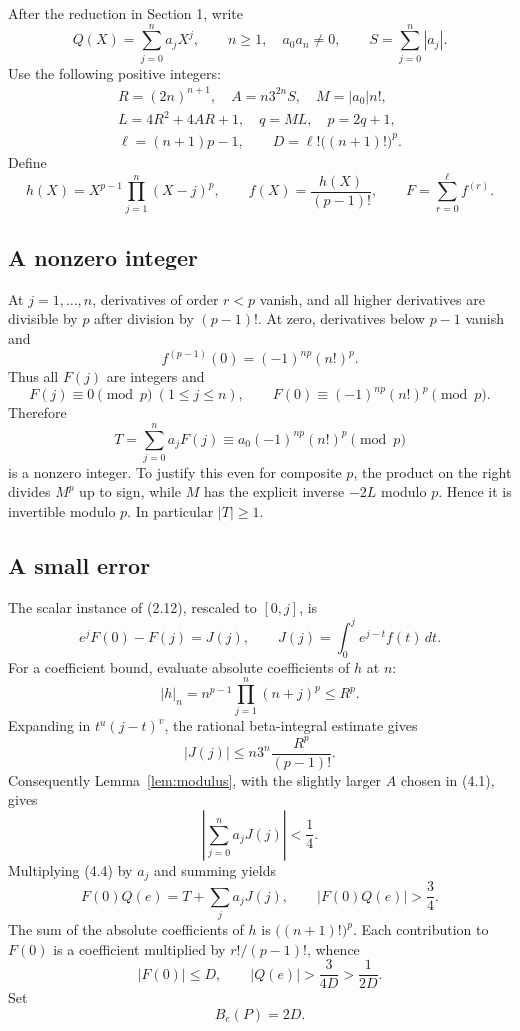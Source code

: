 \documentclass[11pt]{article}
\theoremstyle{definition}
\begin{document}
After the reduction in Section 1, write
\[
 Q(X)=\sum_{j=0}^n a_jX^j,\qquad n\ge1,\quad a_0a_n\ne0,
 \qquad S=\sum_{j=0}^n|a_j|.
\]
Use the following positive integers:
\[
 \begin{gathered}
 R=(2n)^{n+1},\quad A=n3^{2n}S,\quad M=|a_0|n!,\\
 L=4R^2+4AR+1,\quad q=ML,\quad p=2q+1,\\
 \ell=(n+1)p-1,\qquad
 D=\ell!\bigl((n+1)!\bigr)^p.
 \end{gathered} \tag{4.1}
\]
Define
\[
 h(X)=X^{p-1}\prod_{j=1}^n(X-j)^p,\qquad
 f(X)=\frac{h(X)}{(p-1)!},\qquad F=\sum_{r=0}^{\ell}f^{(r)}.
 \tag{4.2}
\]

\subsection{A nonzero integer}

At \(j=1,\ldots,n\), derivatives of order \(r<p\) vanish, and all
higher derivatives are divisible by \(p\) after division by \((p-1)!\).
At zero, derivatives below \(p-1\) vanish and
\[
 f^{(p-1)}(0)=(-1)^{np}(n!)^p.
\]
Thus all \(F(j)\) are integers and
\[
 F(j)\equiv0\pmod p\ (1\le j\le n),\qquad
 F(0)\equiv(-1)^{np}(n!)^p\pmod p. \tag{4.3}
\]
Therefore
\[
 T=\sum_{j=0}^na_jF(j)
 \equiv a_0(-1)^{np}(n!)^p\pmod p
\]
is a nonzero integer. To justify this even for composite \(p\), the
product on the right divides \(M^p\) up to sign, while
\(M\) has the explicit inverse \(-2L\) modulo \(p\).
Hence it is invertible modulo \(p\). In particular \(|T|\ge1\).

\subsection{A small error}

The scalar instance of (2.12), rescaled to \([0,j]\), is
\[
 e^jF(0)-F(j)=J(j),\qquad
 J(j)=\int_0^j e^{j-t}f(t)\,dt. \tag{4.4}
\]
For a coefficient bound, evaluate absolute coefficients of \(h\) at \(n\):
\[
 |h|_n=n^{p-1}\prod_{j=1}^n(n+j)^p\le R^p.
\]
Expanding in \(t^u(j-t)^v\), the rational beta-integral estimate gives
\[
 |J(j)|\le n3^n\frac{R^p}{(p-1)!}.
\]
Consequently Lemma~\ref{lem:modulus}, with the slightly larger \(A\)
chosen in (4.1), gives
\[
 \left|\sum_{j=0}^na_jJ(j)\right|<\frac14. \tag{4.5}
\]
Multiplying (4.4) by \(a_j\) and summing yields
\[
 F(0)Q(e)=T+\sum_j a_jJ(j),\qquad
 |F(0)Q(e)|>\frac34. \tag{4.6}
\]
The sum of the absolute coefficients of \(h\) is
\(\bigl((n+1)!\bigr)^p\). Each contribution to \(F(0)\) is
a coefficient multiplied by \(r!/(p-1)!\), whence
\[
 |F(0)|\le D,\qquad
 |Q(e)|>\frac{3}{4D}>\frac1{2D}. \tag{4.7}
\]
Set
\[
 \boxed{B_e(P)=2D}. \tag{4.8}
\]
\end{document}
